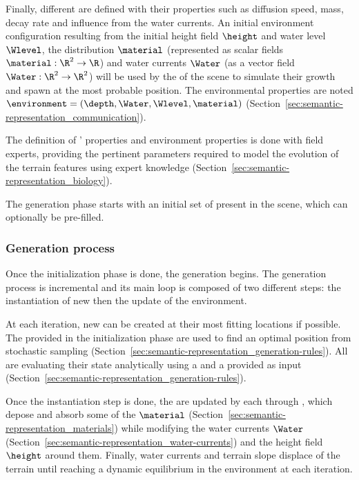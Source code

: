 Finally, different  are defined with their properties such as diffusion speed, mass, decay rate and influence from the water currents. An initial environment configuration resulting from the initial height field $\height$ and water level $\Wlevel$, the  distribution $\material$ (represented as scalar fields $\material: \R^2 \to \R$) and water currents $\Water$ (as a vector field $\Water: \R^2 \to \R^2$) will be used by the  of the scene to simulate their growth and spawn at the most probable position. The environmental properties are noted $\environment = (\depth, \Water, \Wlevel, \material)$ (Section~\ref{sec:semantic-representation_communication}).

The definition of ' properties and environment properties is done with field experts, providing the pertinent parameters required to model the evolution of the terrain features using expert knowledge (Section~\ref{sec:semantic-representation_biology}). 

The generation phase starts with an initial set of  present in the scene, which can optionally be pre-filled.

\subsubsection{Generation process} 

Once the initialization phase is done, the generation begins. The generation process is incremental and its main loop is composed of two different steps: the instantiation of new  then the update of the environment.


At each iteration, new  can be created at their most fitting locations if possible. The  provided in the initialization phase are used to find an optimal position from stochastic sampling (Section~\ref{sec:semantic-representation_generation-rules}). 
All  are evaluating their state analytically using a  and a  provided as input (Section~\ref{sec:semantic-representation_generation-rules}).

Once the instantiation step is done, the  are updated by each  through , which depose and absorb some of the  $\material$ (Section~\ref{sec:semantic-representation_materials}) while modifying the water currents $\Water$ (Section~\ref{sec:semantic-representation_water-currents}) and the height field $\height$ around them. Finally, water currents and terrain slope displace  of the terrain until reaching a dynamic equilibrium in the environment at each iteration.

